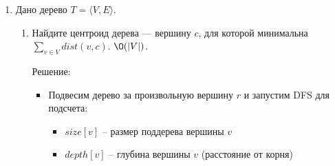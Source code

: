 \begin{enumerate}
\begin{enumerate}
\begin{itemize}
        Это означает, что из поддерева $y$ (содержащего $b$) нет обратных рёбер, ведущих к предкам вершины $x$.

        \item Финальный алгоритм:
        \begin{enumerate}
          \item Запустить DFS из $a$, вычисляя $enter$, $ret$ и сохраняя $parent$
          \item Восстановить путь $a \leadsto b$ по массиву $parent$
          \item Для каждой вершины $x$ на пути (кроме $a$ и $b$): если $ret(y) \geq enter(x)$, где $y$ -- следующая вершина пути, то $x$ -- искомая вершина
        \end{enumerate}

        \item Сложность по времени:
        \begin{itemize}
          \item DFS для вычисления $enter$, $ret$, $parent$ -- $\O(|V| + |E|)$
          \item Восстановление пути и проверка вершин -- $\O(|V|)$
        \end{itemize}
        
        Итого: $\O(|V| + |E|)$
        
        \item Сложность по памяти: $\O(|V|)$ -- массивы $enter$, $ret$, $parent$
      
      \end{itemize}

    \end{enumerate}

  \item
    Дано дерево $T = \langle V, E \rangle$.
    \begin{enumerate}
      \item
        Найдите центроид дерева --- вершину $c$, для которой минимальна \\
        $\sum_{v \in V} dist(v, c)$. $\O(|V|)$.

        Решение:

        \begin{itemize}
          
          \item Подвесим дерево за произвольную вершину $r$ и запустим DFS для подсчета:
          \begin{itemize}
            \item $size[v]$ -- размер поддерева вершины $v$
            \item $depth[v]$ -- глубина вершины $v$ (расстояние от корня)
          \end{itemize}


\end{itemize}
\end{enumerate}
\end{enumerate}
